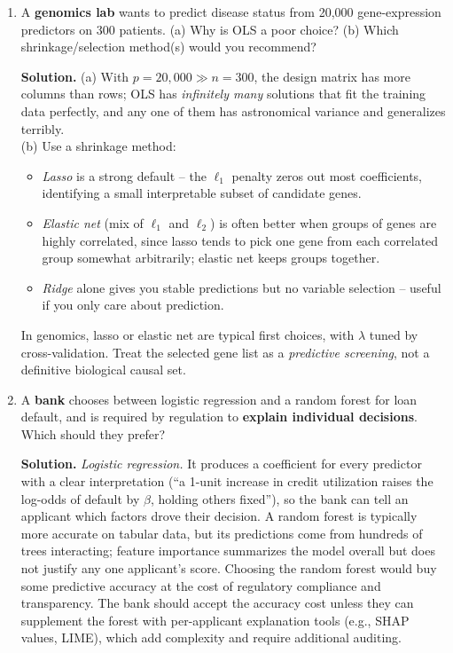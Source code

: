 \documentclass[11pt]{article}
\newcommand{\solution}[1]{%
  \par\medskip\noindent\textbf{Solution.} #1\par\medskip
}
\begin{document}
\begin{enumerate}[leftmargin=*]

\item A \textbf{genomics lab} wants to predict disease status from 20{,}000 gene-expression predictors on 300 patients. (a) Why is OLS a poor choice? (b) Which shrinkage/selection method(s) would you recommend?

\solution{(a) With $p = 20{,}000 \gg n = 300$, the design matrix has more columns than rows; OLS has \emph{infinitely many} solutions that fit the training data perfectly, and any one of them has astronomical variance and generalizes terribly.\\
(b) Use a shrinkage method:
\begin{itemize}
\item \emph{Lasso} is a strong default -- the $\ell_1$ penalty zeros out most coefficients, identifying a small interpretable subset of candidate genes.
\item \emph{Elastic net} (mix of $\ell_1$ and $\ell_2$) is often better when groups of genes are highly correlated, since lasso tends to pick one gene from each correlated group somewhat arbitrarily; elastic net keeps groups together.
\item \emph{Ridge} alone gives you stable predictions but no variable selection -- useful if you only care about prediction.
\end{itemize}
In genomics, lasso or elastic net are typical first choices, with $\lambda$ tuned by cross-validation. Treat the selected gene list as a \emph{predictive screening}, not a definitive biological causal set.}

\item A \textbf{bank} chooses between logistic regression and a random forest for loan default, and is required by regulation to \textbf{explain individual decisions}. Which should they prefer?

\solution{\emph{Logistic regression.} It produces a coefficient for every predictor with a clear interpretation (``a 1-unit increase in credit utilization raises the log-odds of default by $\beta$, holding others fixed''), so the bank can tell an applicant which factors drove their decision. A random forest is typically more accurate on tabular data, but its predictions come from hundreds of trees interacting; feature importance summarizes the model overall but does not justify any one applicant's score. Choosing the random forest would buy some predictive accuracy at the cost of regulatory compliance and transparency. The bank should accept the accuracy cost unless they can supplement the forest with per-applicant explanation tools (e.g., SHAP values, LIME), which add complexity and require additional auditing.}


\end{enumerate}
\end{document}
